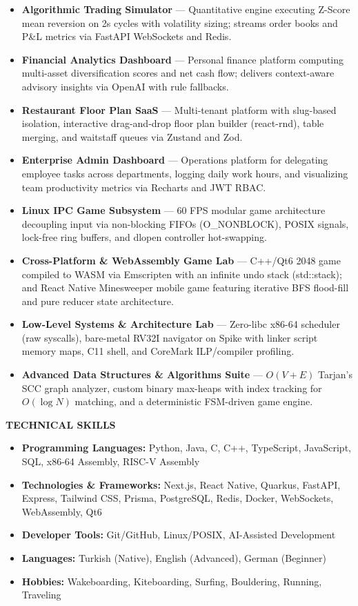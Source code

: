 \documentclass[a4paper]{article}
\newcommand{\sechead}[1]{%
    \vspace{7.5pt}%
    {\centering\fontsize{11}{13}\textbf{\MakeUppercase{#1}}\par}%
    \vspace{3.5pt}%
}
\newcommand{\desc}[1]{%
    {\fontsize{9.5}{12.5}\selectfont #1}%
}
\begin{document}
\begin{itemize}[leftmargin=1.1em, itemsep=0.8pt, parsep=0pt, topsep=1.2pt]
   \item \desc{\textbf{Algorithmic Trading Simulator} --- Quantitative engine executing Z-Score mean reversion on 2s cycles with volatility sizing; streams order books and P\&L metrics via FastAPI WebSockets and Redis.}
   \item \desc{\textbf{Financial Analytics Dashboard} --- Personal finance platform computing multi-asset diversification scores and net cash flow; delivers context-aware advisory insights via OpenAI with rule fallbacks.}
   \item \desc{\textbf{Restaurant Floor Plan SaaS} --- Multi-tenant platform with slug-based isolation, interactive drag-and-drop floor plan builder (react-rnd), table merging, and waitstaff queues via Zustand and Zod.}
   \item \desc{\textbf{Enterprise Admin Dashboard} --- Operations platform for delegating employee tasks across departments, logging daily work hours, and visualizing team productivity metrics via Recharts and JWT RBAC.}
   \item \desc{\textbf{Linux IPC Game Subsystem} --- 60 FPS modular game architecture decoupling input via non-blocking FIFOs (O\_NONBLOCK), POSIX signals, lock-free ring buffers, and dlopen controller hot-swapping.}
   \item \desc{\textbf{Cross-Platform \& WebAssembly Game Lab} --- C++/Qt6 2048 game compiled to WASM via Emscripten with an infinite undo stack (std::stack); and React Native Minesweeper mobile game featuring iterative BFS flood-fill and pure reducer state architecture.}
   \item \desc{\textbf{Low-Level Systems \& Architecture Lab} --- Zero-libc x86-64 scheduler (raw syscalls), bare-metal RV32I navigator on Spike with linker script memory maps, C11 shell, and CoreMark ILP/compiler profiling.}
   \item \desc{\textbf{Advanced Data Structures \& Algorithms Suite} --- $O(V+E)$ Tarjan's SCC graph analyzer, custom binary max-heaps with index tracking for $O(\log N)$ matching, and a deterministic FSM-driven game engine.}
\end{itemize}

\sechead{Technical Skills}

\begin{itemize}[leftmargin=1.1em, itemsep=1.8pt, parsep=0pt, topsep=1.5pt]
    \item \desc{\textbf{Programming Languages:} Python, Java, C, C++, TypeScript, JavaScript, SQL, x86-64 Assembly, RISC-V Assembly}
    \item \desc{\textbf{Technologies \& Frameworks:} Next.js, React Native, Quarkus, FastAPI, Express, Tailwind CSS, Prisma, PostgreSQL, Redis, Docker, WebSockets, WebAssembly, Qt6}
    \item \desc{\textbf{Developer Tools:} Git/GitHub, Linux/POSIX, AI-Assisted Development}
    \item \desc{\textbf{Languages:} Turkish (Native), English (Advanced), German (Beginner)}
    \item \desc{\textbf{Hobbies:} Wakeboarding, Kiteboarding, Surfing, Bouldering, Running, Traveling}
\end{itemize}
\end{document}
